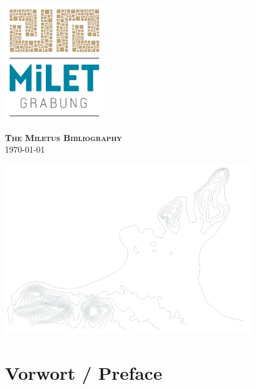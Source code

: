 
\begin{titlepage}
\vspace*{3cm}
\begin{center}
    \includegraphics[height=5cm]{../data/figures/milet-logo-de}\\
    \vspace*{1cm}

    {\LARGE \textsc{\textbf{The Miletus Bibliography}}}\\

    \today\\
    \vspace*{2cm}

    \includegraphics[width=0.8\textwidth]{../data/figures/Gelaende2.png}
\end{center}

\end{titlepage}

\chapter{Vorwort / Preface}
\nocite{*}
\setcounter{page}{2}


